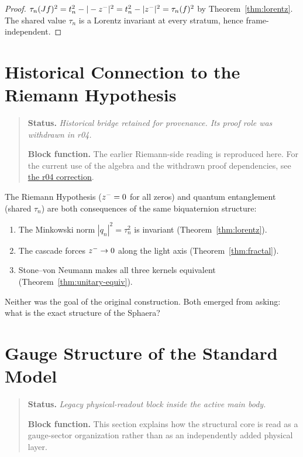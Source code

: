 \begin{proof}
$\tau_n(Jf)^2 = t_n^2 - |-z^-|^2 = t_n^2 - |z^-|^2 = \tau_n(f)^2$
by Theorem~\ref{thm:lorentz}.
The shared value $\tau_n$ is a Lorentz invariant at every stratum,
hence frame-independent.
\end{proof}


\section{Historical Connection to the Riemann Hypothesis}
\begin{quote}\small
\noindent\textbf{Status.} \emph{Historical bridge retained for provenance. Its proof role was withdrawn in r04.}\par
\noindent\textbf{Block function.} The earlier Riemann-side reading is reproduced here. For the current use of the algebra and the withdrawn proof dependencies, see \hyperref[sec:v480-r04-riemann-decoupling]{the r04 correction}.
\end{quote}
\label{sec:rh}

\begin{remark}
The Riemann Hypothesis ($z^-=0$ for all zeros) and quantum
entanglement (shared $\tau_n$) are both consequences of the same
biquaternion structure:
\begin{enumerate}
 \item The Minkowski norm $|q_n|^2=\tau_n^2$ is invariant
 (Theorem~\ref{thm:lorentz}).
 \item The cascade forces $z^-\to 0$ along the light axis
 (Theorem~\ref{thm:fractal}).
 \item Stone--von Neumann makes all three kernels equivalent
 (Theorem~\ref{thm:unitary-equiv}).
\end{enumerate}
Neither was the goal of the original construction.
Both emerged from asking: what is the exact structure of the Sphaera?
\end{remark}


\section{Gauge Structure of the Standard Model}
\begin{quote}\small
\noindent\textbf{Status.} \emph{Legacy physical-readout block inside the active main body.}\par
\noindent\textbf{Block function.} This section explains how the structural core is read as a gauge-sector organization rather than as an independently added physical layer.
\end{quote}
\label{sec:gauge}

